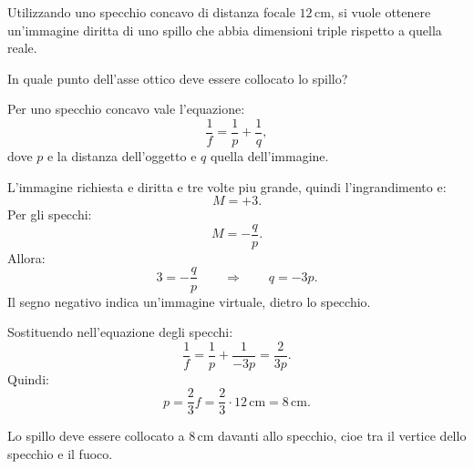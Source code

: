 
\begin{esercizio}
Utilizzando uno specchio concavo di distanza focale \(12\,\mathrm{cm}\), si
vuole ottenere un'immagine diritta di uno spillo che abbia dimensioni triple
rispetto a quella reale.

In quale punto dell'asse ottico deve essere collocato lo spillo?
\end{esercizio}

\begin{soluzione}
Per uno specchio concavo vale l'equazione:
\[
\frac{1}{f}=\frac{1}{p}+\frac{1}{q},
\]
dove \(p\) e la distanza dell'oggetto e \(q\) quella dell'immagine.

L'immagine richiesta e diritta e tre volte piu grande, quindi
l'ingrandimento e:
\[
M=+3.
\]
Per gli specchi:
\[
M=-\frac{q}{p}.
\]
Allora:
\[
3=-\frac{q}{p}
\qquad\Rightarrow\qquad
q=-3p.
\]
Il segno negativo indica un'immagine virtuale, dietro lo specchio.

Sostituendo nell'equazione degli specchi:
\[
\frac{1}{f}=\frac{1}{p}+\frac{1}{-3p}
=\frac{2}{3p}.
\]
Quindi:
\[
p=\frac{2}{3}f
=\frac{2}{3}\cdot 12\,\mathrm{cm}
=8\,\mathrm{cm}.
\]

Lo spillo deve essere collocato a \(8\,\mathrm{cm}\) davanti allo specchio,
cioe tra il vertice dello specchio e il fuoco.
\end{soluzione}
